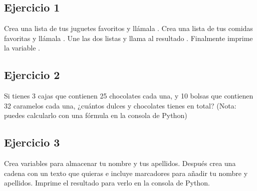 \subsection*{Ejercicio 1}
Crea una lista de tus juguetes favoritos y llámala . Crea una lista de tus comidas favoritas y llámala . Une las dos listas y llama al resultado . Finalmente imprime la variable .

\subsection*{Ejercicio 2}
Si tienes 3 cajas que contienen 25 chocolates cada una, y 10 bolsas que contienen 32 caramelos cada una, ¿cuántos dulces y chocolates tienes en total? (Nota: puedes calcularlo con una fórmula en la consola de Python)

\subsection*{Ejercicio 3}
Crea variables para almacenar tu nombre y tus apellidos. Después crea una cadena con un texto que quieras e incluye marcadores para añadir tu nombre y apellidos. Imprime el resultado para verlo en la consola de Python. 


\newpage
